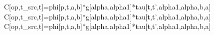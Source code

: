 C[op,t_src,t]=phi[p,t,a,b]*g[alpha,alpha1]*tau[t,t',alpha1,alpha,b,a]
C[op,t_src,t]=phi[p,t,a,b]*g[alpha,alpha1]*tau[t,t',alpha1,alpha,b,a]
C[op,t_src,t]=phi[p,t,a,b]*g[alpha,alpha1]*tau[t,t',alpha1,alpha,b,a]
